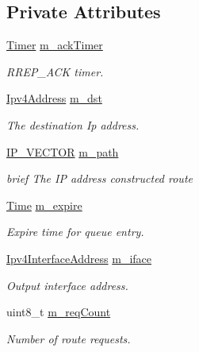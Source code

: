 \subsection*{Private Attributes}
\begin{DoxyCompactItemize}
\item 
\hyperlink{classns3_1_1Timer}{Timer} \hyperlink{classns3_1_1dsr_1_1DsrRouteCacheEntry_a8013906579662693b0510b0c208bc6a2}{m\+\_\+ack\+Timer}
\begin{DoxyCompactList}\small\item\em R\+R\+E\+P\+\_\+\+A\+CK timer. \end{DoxyCompactList}\item 
\hyperlink{classns3_1_1Ipv4Address}{Ipv4\+Address} \hyperlink{classns3_1_1dsr_1_1DsrRouteCacheEntry_a5c582e9df674d453f476faec4834bb97}{m\+\_\+dst}
\begin{DoxyCompactList}\small\item\em The destination Ip address. \end{DoxyCompactList}\item 
\hyperlink{classns3_1_1dsr_1_1DsrRouteCacheEntry_ab834177006bdbfd2e3fa607c2a88cbdf}{I\+P\+\_\+\+V\+E\+C\+T\+OR} \hyperlink{classns3_1_1dsr_1_1DsrRouteCacheEntry_a58391601372b1dbd097813c41923fcc1}{m\+\_\+path}
\begin{DoxyCompactList}\small\item\em brief The IP address constructed route \end{DoxyCompactList}\item 
\hyperlink{classns3_1_1Time}{Time} \hyperlink{classns3_1_1dsr_1_1DsrRouteCacheEntry_a3355b3313a221da25a3fced528c526e9}{m\+\_\+expire}
\begin{DoxyCompactList}\small\item\em Expire time for queue entry. \end{DoxyCompactList}\item 
\hyperlink{classns3_1_1Ipv4InterfaceAddress}{Ipv4\+Interface\+Address} \hyperlink{classns3_1_1dsr_1_1DsrRouteCacheEntry_a9b83f6f236a92a0fde432d55d5b6617f}{m\+\_\+iface}
\begin{DoxyCompactList}\small\item\em Output interface address. \end{DoxyCompactList}\item 
uint8\+\_\+t \hyperlink{classns3_1_1dsr_1_1DsrRouteCacheEntry_a7c85df057c3652d168519991b92616f2}{m\+\_\+req\+Count}
\begin{DoxyCompactList}\small\item\em Number of route requests. \end{DoxyCompactList}\item 

\end{DoxyCompactItemize}
